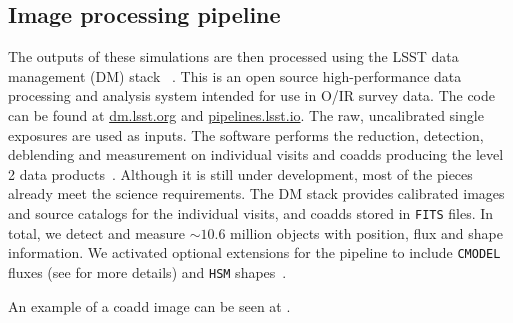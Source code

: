 \documentclass[\docopts]{\docclass}
\begin{document}


\subsection{Image processing pipeline}
\label{sec:image_processing_pipeline}

The outputs of these simulations are then processed using the LSST data management (DM) stack~\citep{2008arXiv0805.2366I,ScienceBook,WhitePaper,2017arXiv170506766B,2015arXiv151207914J} . This is an open
source high-performance data processing and analysis system intended for use in O/IR survey data. The code can be found at \url{dm.lsst.org} and \url{pipelines.lsst.io}. The raw, uncalibrated single exposures are used as inputs. The software performs the reduction, detection, deblending and measurement on individual visits and coadds producing the level 2 data products~\citep{2015arXiv151207914J}. Although it is still under development, most of the pieces already meet the science requirements. The DM stack provides calibrated images and source catalogs for the individual visits, and coadds stored in \texttt{FITS} files. In total, we detect and measure $\sim 10.6$ million objects with position, flux and shape information. We activated optional extensions for the pipeline to include \texttt{CMODEL} fluxes (see \cite{2017arXiv170506766B} for more details) and \texttt{HSM} shapes~\citep{2003MNRAS.343..459H,2005MNRAS.361.1287M}.

An example of a coadd image can be seen at .
\end{document}
